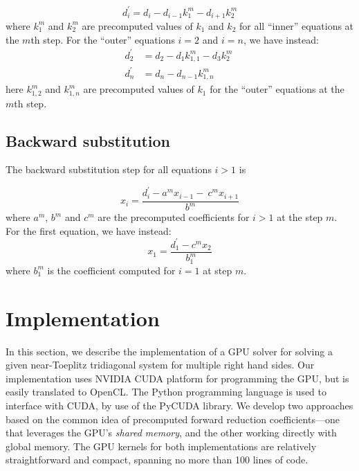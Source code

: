 \begin{equation}
d^{\prime}_i = d_i - d_{i-1}k_1^{m}  - d_{i+1}k_2^{m}
\label{eqn:precomputed-forward-reduction-step}
\end{equation}
%
where $k_1^m$ and $k_2^m$ are
precomputed values of $k_1$ and $k_2$
for all ``inner'' equations at the $m$th step.
For the ``outer'' equations $i=2$ and $i=n$,
we have instead:
%
\begin{align}
    d^{\prime}_2 &= d_2 - d_{1}k_{1,1}^{m}  - d_{3}k_2^{m} \
    \label{eqn:precomputed-forward-reduction-step-2} \\
    d^{\prime}_n &= d_n - d_{n-1}k_{1,n}^{m} \
    \label{eqn:precomputed-forward-reduction-step-n} 
\end{align}
%
here $k_{1,2}^m$ and $k_{1,n}^m$ are
precomputed values of $k_1$
for the ``outer'' equations at the $m$th step.

\subsection{Backward substitution}

The backward substitution step for all equations $i > 1$ is

\begin{equation}
x_i = \frac{d^{\prime}_i - a^mx_{i-1} - \
    c^{m}x_{i+1}}{b^m}
\label{eqn:precomputed-backward-substitution-step}
\end{equation}
%
where $a^m$, $b^m$ and $c^m$ are the precomputed
coefficients for $i>1$ at the step $m$.
For the first equation, we have instead:
%
\begin{equation}
x_1 = \frac{d^{\prime}_1 - c^{m}x_{2}}{b_1^m}
\label{eqn:precomputed-backward-substitution-step-1}
\end{equation}
%
where $b_1^m$ is the
coefficient computed for $i = 1$ at step $m$.

\section{Implementation}

In this section, we describe the implementation of a GPU solver
for solving a given near-Toeplitz tridiagonal system
for multiple right hand sides.
Our implementation uses
NVIDIA CUDA platform for programming the GPU,
but is easily translated to OpenCL.
The Python programming language is used
to interface with CUDA, by use of the
PyCUDA \cite{kloeckner_pycuda_2012} library.
We develop two approaches based on the common idea
of precomputed forward reduction coefficients---one that leverages
the GPU's \emph{shared memory},
and the other working directly with global memory.
The GPU kernels for both implementations are relatively
straightforward and compact,
spanning no more than 100 lines of code.

